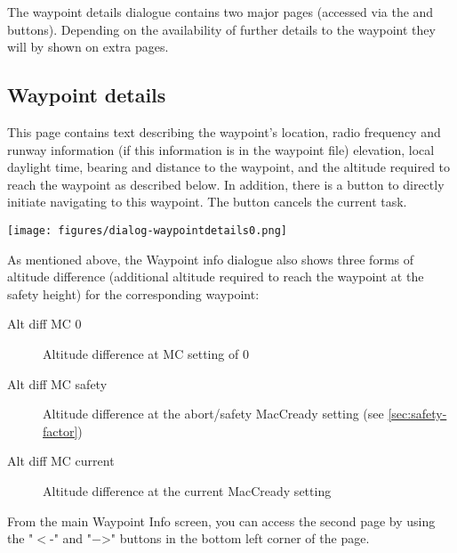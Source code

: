 The waypoint details dialogue contains two major pages (accessed via the
\button{$>$} and \button{$<$} buttons). Depending on the availability of further
details to the waypoint they will by shown on extra pages.

\subsection*{Waypoint details}\label{sec:waypointdetails}
This page contains text describing the waypoint's location, radio frequency and 
runway information (if this information is in the waypoint file) elevation, 
local daylight time, bearing and distance to the waypoint, and the altitude required 
to reach the waypoint as described below. In addition, there is a button 
 to directly initiate
navigating to this waypoint. The button cancels the current task. 
\begin{center}
\texttt{[image: figures/dialog-waypointdetails0.png]}
\end{center}

As mentioned above, the Waypoint info dialogue also shows three forms of altitude 
difference (additional
altitude required to reach the waypoint at the safety height) for
the corresponding waypoint:
\begin{description}
\item[Alt diff MC 0] Altitude difference at MC setting of 0
\item[Alt diff MC safety] Altitude difference at the abort/safety MacCready 
  setting (see \ref{sec:safety-factor})
\item[Alt diff MC current] Altitude difference at the current MacCready setting
\end{description}

From the main Waypoint Info screen, you can access the second page by using the 
"$<$-" and "$-$>" buttons in the bottom left corner of the page.
